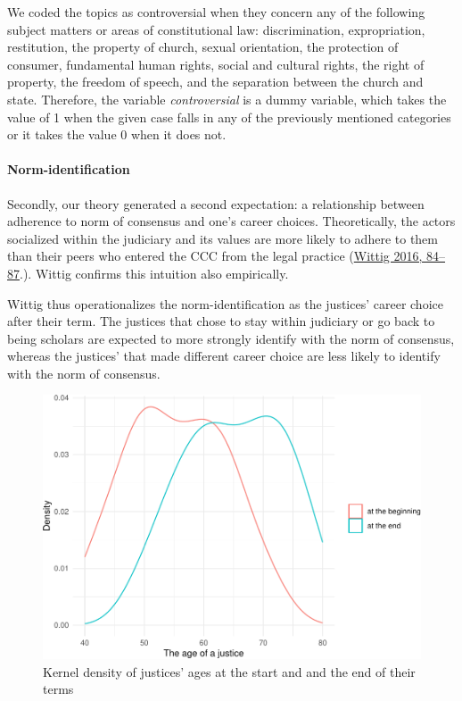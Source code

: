 \documentclass[
  11pt,
]{article}
\begin{document}
We coded the topics as controversial when they concern any of the
following subject matters or areas of constitutional law:
discrimination, expropriation, restitution, the property of church,
sexual orientation, the protection of consumer, fundamental human
rights, social and cultural rights, the right of property, the freedom
of speech, and the separation between the church and state. Therefore,
the variable \emph{controversial} is a dummy variable, which takes the
value of 1 when the given case falls in any of the previously mentioned
categories or it takes the value 0 when it does not.

\hypertarget{norm-identification}{%
\paragraph{Norm-identification}\label{norm-identification}}

Secondly, our theory generated a second expectation: a relationship
between adherence to norm of consensus and one's career choices.
Theoretically, the actors socialized within the judiciary and its values
are more likely to adhere to them than their peers who entered the CCC
from the legal practice
(\protect\hyperlink{ref-wittigOccurrenceSeparateOpinions2016}{Wittig
2016, 84--87}.). Wittig confirms this intuition also empirically.

Wittig thus operationalizes the norm-identification as the justices'
career choice after their term. The justices that chose to stay within
judiciary or go back to being scholars are expected to more strongly
identify with the norm of consensus, whereas the justices' that made
different career choice are less likely to identify with the norm of
consensus.

\begin{figure}
\centering
\includegraphics{separate_opinions_files/figure-latex/unnamed-chunk-4-1.pdf}
\caption{Kernel density of justices' ages at the start and and the end
of their terms}
\end{figure}
\end{document}
